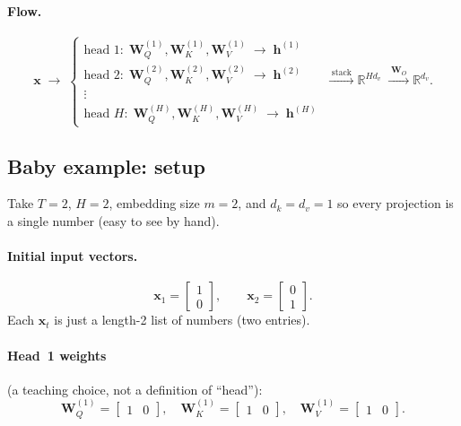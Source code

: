 \documentclass[11pt]{article}
\begin{document}
\paragraph{Flow.}
\[
  \mathbf{x}
  \;\longrightarrow\;
  \begin{cases}
  \text{head }1:\;
  \mathbf{W}_Q^{(1)},\mathbf{W}_K^{(1)},\mathbf{W}_V^{(1)}
  \;\to\;\mathbf{h}^{(1)} \\[0.2em]
  \text{head }2:\;
  \mathbf{W}_Q^{(2)},\mathbf{W}_K^{(2)},\mathbf{W}_V^{(2)}
  \;\to\;\mathbf{h}^{(2)} \\[0.2em]
  \vdots \\[0.2em]
  \text{head }H:\;
  \mathbf{W}_Q^{(H)},\mathbf{W}_K^{(H)},\mathbf{W}_V^{(H)}
  \;\to\;\mathbf{h}^{(H)}
  \end{cases}
  \;\xrightarrow{\;\text{stack}\;}
  \mathbb{R}^{H d_v}
  \;\xrightarrow{\;\mathbf{W}_O\;}
  \mathbb{R}^{d_v}.
\]

\subsection{Baby example: setup}

Take \(T=2\), \(H=2\), embedding size \(m=2\), and \(d_k=d_v=1\) so every
projection is a single number (easy to see by hand).

\paragraph{Initial input vectors.}
\[
  \mathbf{x}_1=\begin{bmatrix}1\\0\end{bmatrix},\qquad
  \mathbf{x}_2=\begin{bmatrix}0\\1\end{bmatrix}.
\]
Each \(\mathbf{x}_t\) is just a length-2 list of numbers (two entries).

\paragraph{Head~1 weights} (a teaching choice, not a definition of ``head''):
\[
  \mathbf{W}_Q^{(1)}=\begin{bmatrix}1&0\end{bmatrix},\quad
  \mathbf{W}_K^{(1)}=\begin{bmatrix}1&0\end{bmatrix},\quad
  \mathbf{W}_V^{(1)}=\begin{bmatrix}1&0\end{bmatrix}.
\]
\end{document}
